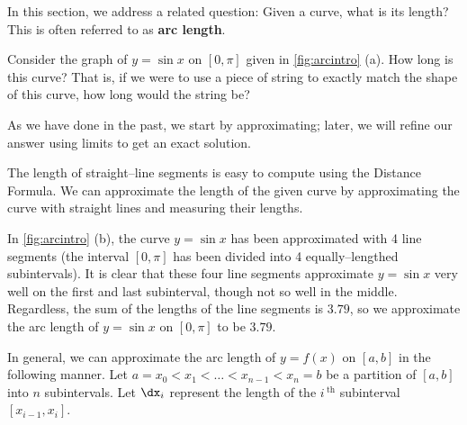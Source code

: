 In this section, we address a related question: Given a curve, what is its length? This is often referred to as \textbf{arc length}. 

Consider the graph of $y=\sin x$ on $[0,\pi]$ given in \autoref{fig:arcintro} (a). How long is this curve? That is, if we were to use a piece of string to exactly match the shape of this curve, how long would the string be?

As we have done in the past, we start by approximating; later, we will refine our answer using limits to get an exact solution.

The length of straight--line segments is easy to compute using the Distance Formula. We can approximate the length of the given curve by approximating the curve with straight lines and measuring their lengths. 

In \autoref{fig:arcintro} (b), the curve $y=\sin x$ has been approximated with 4 line segments (the interval $[0,\pi]$ has been divided into 4 equally--lengthed subintervals). It is clear that these four line segments approximate $y=\sin x$ very well on the first and last subinterval, though not so well in the middle. Regardless, the sum of the lengths of the line segments is $3.79$, so we approximate the arc length of $y=\sin x$ on $[0,\pi]$ to be $3.79$. 


In general,  we can approximate the arc length of $y=f(x)$ on $[a,b]$ in the following manner. Let $a=x_0 < x_1 < \dotso < x_{n-1}< x_n=b$ be a partition of $[a,b]$ into $n$ subintervals. Let $\dx_i$ represent the length of the $i\,^\text{th}$ subinterval $[x_{i-1},x_i]$.

